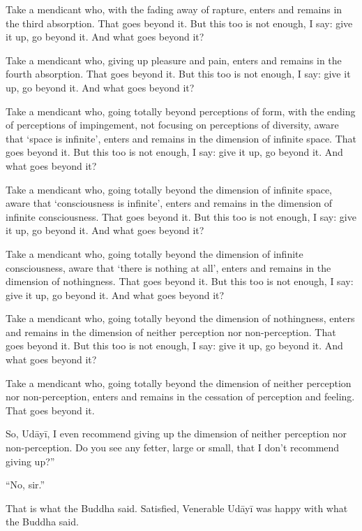 \documentclass[12pt,openany]{book}%
\begin{document}
Take a mendicant who, with the fading away of rapture, enters and remains in the third absorption. That goes beyond it. But this too is not enough, I say: give it up, go beyond it. And what goes beyond it? 

Take a mendicant who, giving up pleasure and pain, enters and remains in the fourth absorption. That goes beyond it. But this too is not enough, I say: give it up, go beyond it. And what goes beyond it? 

Take a mendicant who, going totally beyond perceptions of form, with the ending of perceptions of impingement, not focusing on perceptions of diversity, aware that ‘space is infinite’, enters and remains in the dimension of infinite space. That goes beyond it. But this too is not enough, I say: give it up, go beyond it. And what goes beyond it? 

Take a mendicant who, going totally beyond the dimension of infinite space, aware that ‘consciousness is infinite’, enters and remains in the dimension of infinite consciousness. That goes beyond it. But this too is not enough, I say: give it up, go beyond it. And what goes beyond it? 

Take a mendicant who, going totally beyond the dimension of infinite consciousness, aware that ‘there is nothing at all’, enters and remains in the dimension of nothingness. That goes beyond it. But this too is not enough, I say: give it up, go beyond it. And what goes beyond it? 

Take a mendicant who, going totally beyond the dimension of nothingness, enters and remains in the dimension of neither perception nor non-perception. That goes beyond it. But this too is not enough, I say: give it up, go beyond it. And what goes beyond it? 

Take a mendicant who, going totally beyond the dimension of neither perception nor non-perception, enters and remains in the cessation of perception and feeling. That goes beyond it. 

So, \textsanskrit{Udāyī}, I even recommend giving up the dimension of neither perception nor non-perception. Do you see any fetter, large or small, that I don’t recommend giving up?” 

“No, sir.” 

That is what the Buddha said. Satisfied, Venerable \textsanskrit{Udāyī} was happy with what the Buddha said. 
\end{document}
